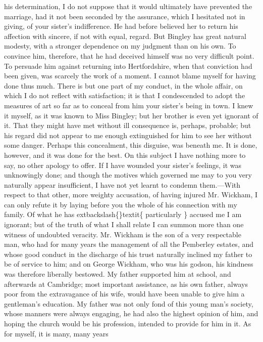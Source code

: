 \documentclass[10pt]{book}
\begin{document}
his determination, I do not
   suppose that it would ultimately have
prevented the marriage, had it not been seconded by the assurance, which
I hesitated not in giving, of your sister’s indifference. He had before
believed her to return his affection with sincere, if not with equal,
regard. But Bingley has great natural modesty, with a stronger
dependence on my judgment than on his own. To convince him, therefore,
that he had deceived himself was no very difficult point. To persuade
him against returning into Hertfordshire, when that conviction had been
given, was scarcely the work of a moment. I cannot blame myself for
having done thus much. There is but one part of my conduct, in the whole
affair, on which I do not reflect with satisfaction; it is that I
condescended to adopt the measures of art so far as to conceal from him
your sister’s being in town. I knew it myself, as it was known to Miss
Bingley; but her brother is even yet ignorant of it. That they might
have met without ill consequence is, perhaps, probable; but his regard
did not appear to me enough extinguished for him to see her without some
danger. Perhaps this concealment, this disguise, was beneath me. It is
done, however, and it was done for the best. On this subject I have
nothing more to say, no other apology to offer. If I have wounded your
sister’s feelings, it was unknowingly done; and though the motives which
governed me may to you very naturally appear insufficient, I have not
yet learnt to condemn them.—With respect to that other, more weighty
accusation, of having injured Mr. Wickham, I can only refute it by
laying before you the whole of his connection with my family. Of what he
has
   	extbackslash\{\}textit\{
    particularly
   \}
   accused me I am ignorant; but of the truth of what I
shall relate I can summon more than one witness of undoubted veracity.
   Mr. Wickham is the son of a very respectable man, who had for many years
the management of all the Pemberley estates, and whose good conduct in
the discharge of his trust naturally inclined my father to be of service
to him; and on George Wickham, who was his godson, his kindness was
therefore liberally bestowed. My father supported him at school, and
afterwards at Cambridge; most important assistance, as his own father,
always poor from the extravagance of his wife, would have been unable to
give him a gentleman’s education. My father was not only fond of this
young man’s society, whose manners were always engaging, he had also the
highest opinion of him, and hoping the church would be his profession,
intended to provide for him in it. As for myself, it is many, many years
\end{document}
